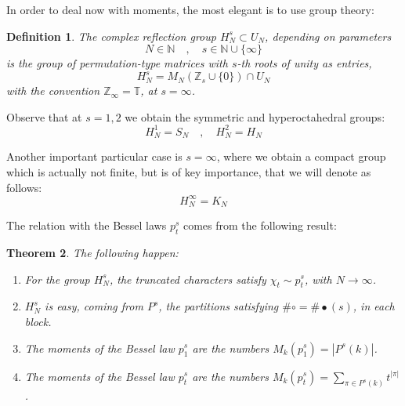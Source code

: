 \documentclass[12pt]{amsbook}
\newtheorem{theorem}{Theorem}[chapter]
\newtheorem{definition}[theorem]{Definition}
\begin{document}
In order to deal now with moments, the most elegant is to use group theory:


\begin{definition}
The complex reflection group $H_N^s\subset U_N$, depending on parameters
$$N\in\mathbb N\quad,\quad s\in\mathbb N\cup\{\infty\}$$
is the group of permutation-type matrices with $s$-th roots of unity as entries,
$$H_N^s=M_N(\mathbb Z_s\cup\{0\})\cap U_N$$
with the convention $\mathbb Z_\infty=\mathbb T$, at $s=\infty$.
\end{definition}

Observe that at $s=1,2$ we obtain the symmetric and hyperoctahedral groups:
$$H_N^1=S_N\quad,\quad 
H_N^2=H_N$$

Another important particular case is $s=\infty$, where we obtain a compact group which is actually not finite, but is of key importance, that we will denote as follows:
$$H_N^\infty=K_N$$

The relation with the Bessel laws $p^s_t$ comes from the following result:

\begin{theorem}
The following happen:
\begin{enumerate}
\item For the group $H_N^s$, the truncated characters satisfy $\chi_t\sim p^s_t$, with $N\to\infty$.

\item $H_N^s$ is easy, coming from $P^s$, the partitions satisfying $\#\circ=\#\bullet(s)$, in each block.

\item The moments of the Bessel law $p^s_1$ are the numbers $M_k(p^s_1)=|P^s(k)|$.

\item The moments of the Bessel law $p^s_t$ are the numbers $M_k(p^s_t)=\sum_{\pi\in P^s(k)}t^{|\pi|}$.
\end{enumerate}
\end{theorem}
\end{document}
